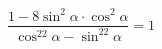 \begin{ex}[type=prove_identity]
	\begin{condition}
		\( \dfrac{1-8\sin^2\alpha\cdot\cos^2\alpha}{\cos^22\alpha-\sin^22\alpha}=1 \)
	\end{condition}
\end{ex}